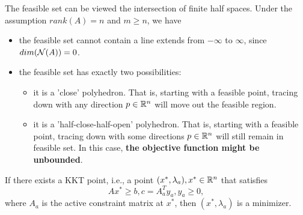 \begin{refsection}
\begin{note}[The geometry of feasible set when  $rank(A) = n$ and $m\geq n$]\label{ch:linear-optimization:remark:geometryofcanonicalconstraints}
The feasible set can be viewed the intersection of finite half spaces. Under the assumption $rank(A) = n$ and $m\geq n$, we have 
\begin{itemize}
	\item the feasible set cannot contain a line extends from $-\infty$ to $\infty$, since $dim(\mathcal{N}(A)) = 0$.
	\item the feasible set has exactly two possibilities:
	\begin{itemize}
		\item it is a 'close' polyhedron. That is, starting with a feasible point, tracing down with any direction $p\in \mathbb{R}^n$ will move out the feasible region.
		\item it is a 'half-close-half-open' polyhedron. That is, starting with a feasible point, tracing down with some directions $p\in \mathbb{R}^n$ will still remain in feasible set. In this case, \textbf{the objective function might be unbounded}.
	\end{itemize}
\end{itemize}
\end{note}


\begin{theorem}\cite[lec 6]{Robinson2015nonlinear2}\label{ch:linear-optimization:th:KKTconditioninequalityCanonicalform}
If there exists a KKT point, i.e., a point $(x^*,\lambda_a), x^*\in \mathbb{R}^n$ that satisfies
$$Ax^* \geq b, c = A^T_ay_a, y_a \geq 0,$$
where $A_a$ is the active constraint matrix at $x^*$, then $(x^*,\lambda_a)$ is a minimizer. 


\end{theorem}
\end{refsection}
